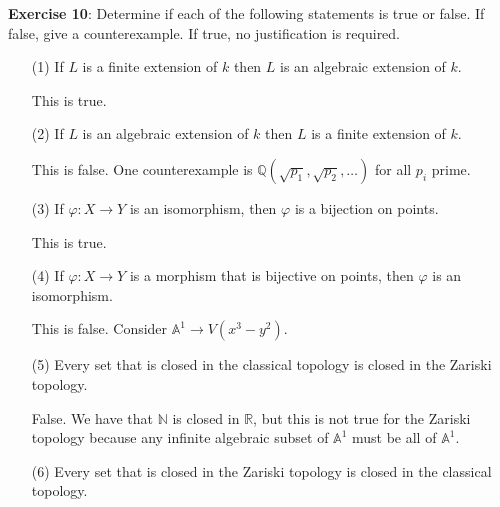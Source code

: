 \documentclass{article}
\begin{document}
\textbf{Exercise 10}: Determine if each of the following statements is true or false. If false, give a counterexample. If true, no justification is required.
    \begin{itemize}
        \item [(1)] If $L$ is a finite extension of $k$ then $L$ is an algebraic extension of $k$.
            \begin{answer}
                This is true.
            \end{answer}

        \item [(2)] If $L$ is an algebraic extension of $k$ then $L$ is a finite extension of $k$.
            \begin{answer}
                This is false. One counterexample is $\mathbb{Q}(\sqrt{p_{1}}, \sqrt{p_{2}}, \ldots)$ for all $p_{i}$ prime.
            \end{answer}

        \item [(3)] If $\varphi: X \rightarrow Y$ is an isomorphism, then $\varphi$ is a bijection on points.
            \begin{answer}
                This is true.
            \end{answer}

        \item [(4)] If $\varphi : X \rightarrow Y$ is a morphism that is bijective on points, then $\varphi$ is an isomorphism.
            \begin{answer}
                This is false. Consider $\mathbb{A}^{1} \rightarrow V(x^{3} - y^{2})$.
            \end{answer}

        \item [(5)] Every set that is closed in the classical topology is closed in the Zariski topology.
            \begin{answer}
                False. We have that $\mathbb{N}$ is closed in $\mathbb{R}$, but this is not true for the Zariski topology because any infinite algebraic subset of $\mathbb{A}^{1}$ must be all of $\mathbb{A}^{1}$.
            \end{answer}

        \item [(6)] Every set that is closed in the Zariski topology is closed in the classical  topology.
            \begin{answer}
                
            \end{answer}


\end{itemize}
\end{document}
